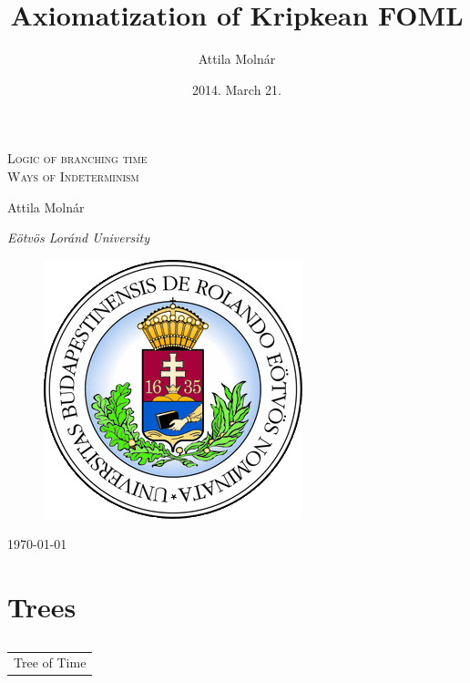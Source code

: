 \documentclass[xcolor=x11names]{beamer}
\author{Attila Moln\'ar}
\date{2014. March 21.}
\title{Axiomatization of Kripkean FOML}
\institute{ELTE}
\makeatletter
\let\beamer@writeslidentry@miniframeson=\beamer@writeslidentry
\def\beamer@writeslidentry@miniframesoff{%
  \expandafter\beamer@ifempty\expandafter{\beamer@framestartpage}{}%
  {%
    \clearpage\beamer@notesactions%
  }
}
\newcommand*{\miniframeson}{\let\beamer@writeslidentry=\beamer@writeslidentry@miniframeson}
\newcommand*{\miniframesoff}{\let\beamer@writeslidentry=\beamer@writeslidentry@miniframesoff}
\newcommand{\cimdia}[1] {\miniframesoff \begin{frame}\begin{center}\huge \begin{tabular}{c}#1\end{tabular}\end{center}\end{frame}\miniframeson}
\newcommand{\szakasz}[2][]{\section{#1}\subsection{}\cimdia{#2}}
\makeatother
\begin{document}
\footnotesize


\begin{frame}
\centering
\textsc{\Large Logic of branching time \\[1em] Ways of Indeterminism}

\bigskip

{ \small Attila Moln\'ar

    \textit{E\"otv\"os Lor\'and University}}

 \begin{figure}
\includegraphics[scale=.3]{elte_cimer.png}
 \end{figure}

	\today
\end{frame}


\szakasz[Trees]{Tree of Time}
\end{document}
